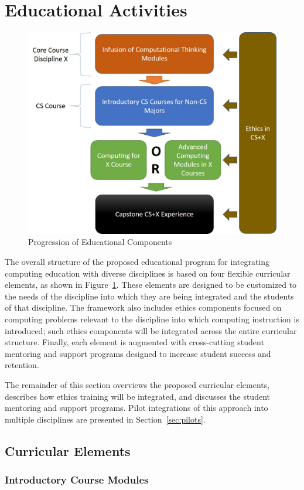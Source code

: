 \section{Educational Activities}
\label{sec:approach}

\begin{figure}
\centerline{\includegraphics[width=.5\textwidth]{Picture1.jpg}}
\caption{Progression  of Educational Components}
\label{fig:structure}
\end{figure}
The overall structure of the proposed educational program for integrating computing education with diverse disciplines is based on four flexible curricular elements, as shown in Figure~\ref{fig:structure}. These elements are designed to be customized to the needs of the  discipline into which they are being integrated and the students of that discipline. The framework also includes ethics components focused on computing problems relevant to the discipline into which computing instruction is introduced; such ethics components will be integrated across the entire curricular structure. Finally, each element is augmented with cross-cutting student mentoring and support programs designed to increase student success and retention. 

The remainder of this section overviews the proposed curricular elements, describes how ethics training will be integrated, and discusses the student mentoring and support programs. Pilot integrations of this approach into multiple disciplines are presented in Section~\ref{sec:pilots}.

\subsection{Curricular Elements}
\subsubsection{Introductory Course Modules}

